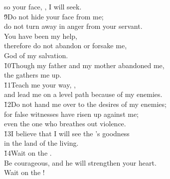 \begin{poetry}
\poemlll       so your face, , I will seek. \\
\poeml \v{9}Do not hide your face from me; \\
\poemll    do not turn away in anger from your servant. \\
\poeml You have been my help, \\
\poemll    therefore do not abandon or forsake me, \\
\poemlll       God of my salvation. \\
\poeml \v{10}Though my father and my mother abandoned me, \\
\poemll    the  gathers me up. \\
\poeml \v{11}Teach me your way, , \\
\poemll    and lead me on a level path because of my enemies. \\
\poeml \v{12}Do not hand me over to the desires of my enemies; \\
\poemll    for false witnesses have risen up against me; \\
\poemlll       even the one who breathes out violence. \\
\poeml \v{13}I believe that I will see the 's goodness \\
\poemll    in the land of the living. \\
\poeml \v{14}Wait on the . \\
\poemll    Be courageous, and he will strengthen your heart. \\
\poemlll       Wait on the !
\end{poetry}

